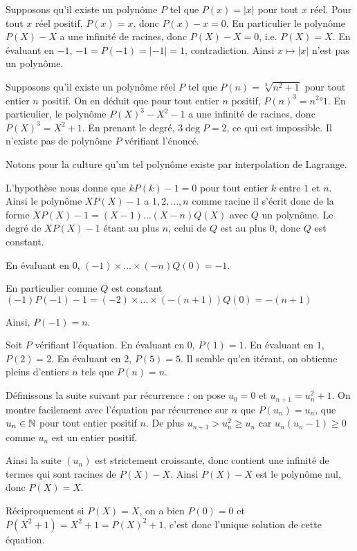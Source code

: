 \begin{sol}
Supposons qu'il existe un polynôme $P$ tel que $P(x) = |x|$ pour tout $x$ réel. Pour tout $x$ réel positif, $P(x) = x$, donc $P(x) - x = 0$. En particulier le polynôme $P(X) - X$ a une infinité de racines, donc $P(X) - X = 0$, i.e. $P(X) = X$. En évaluant en $-1$, $-1 = P(-1) = |-1| = 1$, contradiction. Ainsi $x\mapsto |x|$ n'est pas un polynôme.
\end{sol}


\begin{sol}
Supposons qu'il existe un polynôme réel $P$ tel que $P(n) = \sqrt[3]{n^2 + 1}$ pour tout entier $n$ positif. On en déduit que pour tout entier $n$ positif, $P(n)^3 = n^2°1$. En particulier, le polynôme $P(X)^3 - X^2 - 1$ a une infinité de racines, donc $P(X)^3 = X^2 + 1$. En prenant le degré, $3\deg P = 2$, ce qui est impossible. Il n'existe pas de polynôme $P$ vérifiant l'énoncé.
\end{sol}


\begin{sol}
Notons pour la culture qu'un tel polynôme existe par interpolation de Lagrange.

L'hypothèse nous donne que $kP(k) - 1 = 0$ pour tout entier $k$ entre $1$ et $n$. Ainsi le polynôme $XP(X) - 1$ a $1,2,\dots, n$ comme racine il s'écrit donc de la forme $XP(X) - 1 = (X - 1)\dots (X - n)Q(X)$ avec $Q$ un polynôme. Le degré de $XP(X) - 1$ étant au plus $n$, celui de $Q$ est au plus $0$, donc $Q$ est constant.

En évaluant en $0$, $(-1)\times \dots\times (-n)Q(0) = -1$.

En particulier comme $Q$ est constant $(-1)P(-1) - 1 = (-2)\times\dots \times (-(n + 1))Q(0) = -(n + 1)$

Ainsi, $P(-1) = n$.
\end{sol}


\begin{sol}
Soit $P$ vérifiant l'équation. En évaluant en $0$, $P(1) = 1$. En évaluant en $1$, $P(2) = 2$. En évaluant en $2$, $P(5) = 5$. Il semble qu'en itérant, on obtienne pleins d'entiers $n$ tels que $P(n) = n$.

Définissons la suite suivant par récurrence : on pose $u_0 = 0$ et $u_{n + 1} = u_n^2 + 1$. On montre facilement avec l'équation par récurrence sur $n$ que $P(u_n) = u_n$, que $u_n\in \mathbb N$ pour tout entier positif $n$. De plus $u_{n + 1}>u_n^2\ge u_n$ car $u_n(u_n - 1)\ge 0$ comme $u_n$ est un entier positif.

Ainsi la suite $(u_n)$ est strictement croissante, donc contient une infinité de termes qui sont racines de $P(X) - X$. Ainsi $P(X) - X$ est le polynôme nul, donc $P(X) = X$.

Réciproquement si $P(X) = X$, on a bien $P(0) = 0$ et $P(X^2 + 1) = X^2 + 1 = P(X)^2 + 1$, c'est donc l'unique solution de cette équation.
\end{sol}


